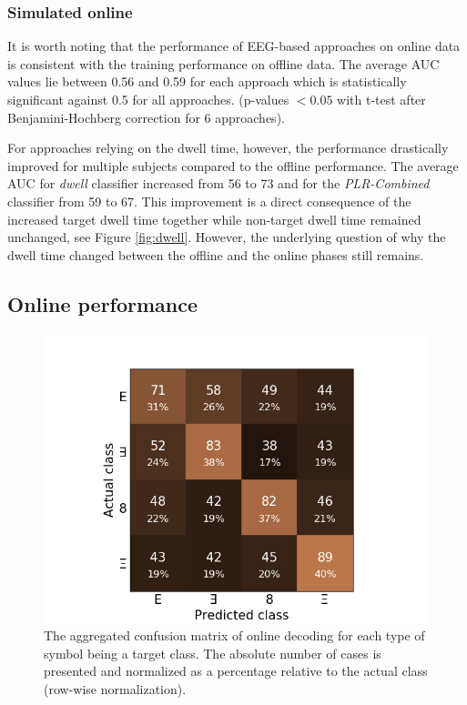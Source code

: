 \documentclass[12pt]{iopart}
\begin{document}
\subsubsection*{Simulated online}
It is worth noting that the performance of EEG-based approaches
on online data is consistent with the training performance on offline data.
The average AUC values lie between 0.56 and 0.59 for each approach
which is statistically significant against 0.5
for all approaches.
(p-values $< 0.05$ with t-test after Benjamini-Hochberg correction 
for 6 approaches).

For approaches relying on the dwell time, however, the performance drastically improved
for multiple subjects compared to the offline performance.
The average AUC for \textit{dwell} classifier increased
from 56 to 73 and for the \textit{PLR-Combined} classifier from 59 to 67.
This improvement is a direct consequence of the increased target dwell time
together while non-target dwell time remained unchanged, see Figure \ref{fig:dwell}.
However, the underlying question of why the dwell time changed 
between the offline and the online phases still remains.


\subsection{Online performance}

\begin{figure}[!t]
    \includegraphics[trim={1cm 0cm 1cm 1cm},clip,width=0.7\columnwidth]{../images/OnlineConfusion_percent.png}
    \caption{The aggregated confusion matrix of online decoding for each type of symbol being
    a target class. The absolute number of cases is presented and normalized as a percentage 
    relative to the actual class (row-wise normalization).}
\label{fig:onlineconf}
\end{figure}
\end{document}
